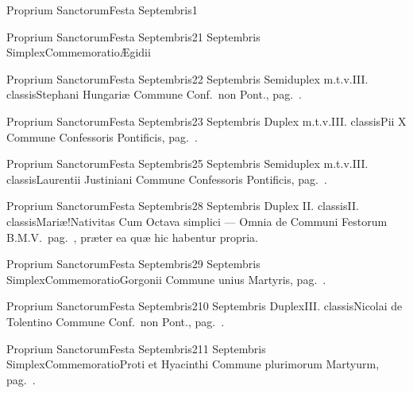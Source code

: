 \documentclass[liber-responsorialis.tex]{subfiles}
\begin{document}
	{Proprium Sanctorum}{Festa Septembris}{1}{}
	{}{}{}{}{}

	{Proprium Sanctorum}{Festa Septembris}{2}{1 Septembris}
	{Simplex}{Commemoratio}{Ægidii}
	{\resptempore}
	{\resptempore}

	{Proprium Sanctorum}{Festa Septembris}{2}{2 Septembris}
	{Semiduplex m.t.v.}{III. classis}{Stephani Hungariæ}
	{Commune Conf.\ non Pont., pag.\ \pageref{M-CONP}.}
	{}

	{Proprium Sanctorum}{Festa Septembris}{2}{3 Septembris}
	{Duplex m.t.v.}{III. classis}{Pii X}
	{Commune Confessoris Pontificis, pag.\ \pageref{M-COPO}.}
	{}

	{Proprium Sanctorum}{Festa Septembris}{2}{5 Septembris}
	{Semiduplex m.t.v.}{III. classis}{Laurentii Justiniani}
	{Commune Confessoris Pontificis, pag.\ \pageref{M-COPO}.}
	{}

	{Proprium Sanctorum}{Festa Septembris}{2}{8 Septembris}
	{Duplex II. classis}{II. classis}{Mariæ!Nativitas}
	{Cum Octava simplici --- Omnia de Communi Festorum B.M.V.\ pag.\ \pageref{M-CBMV}, præter ea quæ hic habentur propria.}
	{}
\tedeumrubric

	{Proprium Sanctorum}{Festa Septembris}{2}{9 Septembris}
	{Simplex}{Commemoratio}{Gorgonii}
	{Commune unius Martyris, pag.\ \pageref{M-UMEX}.}
	{}

	{Proprium Sanctorum}{Festa Septembris}{2}{10 Septembris}
	{Duplex}{III. classis}{Nicolai de Tolentino}
	{Commune Conf.\ non Pont., pag.\ \pageref{M-CONP}.}
	{}

	{Proprium Sanctorum}{Festa Septembris}{2}{11 Septembris}
	{Simplex}{Commemoratio}{Proti et Hyacinthi}
	{Commune plurimorum Martyurm, pag.\ \pageref{M-PMEX}.}
	{}
\end{document}
